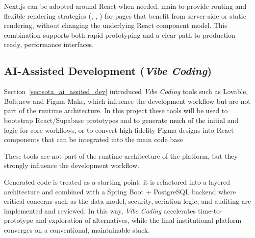         {
            Next.js can be adopted around React when needed, main to provide routing and flexible rendering strategies (, , )
            for pages that benefit from server-side or static rendering, without changing the underlying React component model. 
            This combination supports both rapid prototyping and a clear path to production-ready, performance interfaces.
        }

    \subsection{AI-Assisted Development (\textit{Vibe Coding})}
        {
            Section~\ref{sec:sota_ai_assited_dev} introduced \textit{Vibe Coding} tools such as Lovable, Bolt.new and Figma Make, which influence the development workflow
            but are not part of the runtime architecture. In this project these tools will be used to bootstrap React/Supabase prototypes
            and to generate much of the initial  and  logic for core workflows, or to convert high-fidelity
            Figma designs into React components that can be integrated into the main code base
            
            These tools are not part of the runtime 
            architecture of the platform, but they strongly influence the development workflow.
        }
        
        {
            Generated code is treated as a starting point: it is refactored into a layered architecture and combined with a 
            Spring Boot + PostgreSQL backend where critical concerns such as the data model, security, seriation logic, and auditing
            are implemented and reviewed. 
            In this way, \textit{Vibe Coding} accelerates time-to-prototype and exploration of alternatives, while the final institutional platform
            converges on a conventional, maintainable stack.
        }
    
\label{sec:sota_vibe_coding}
\ntindex[Template]{}